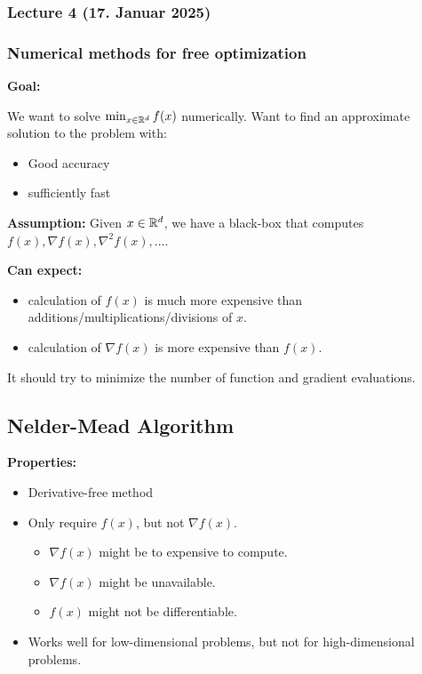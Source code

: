 \subsubsection{Lecture 4 (17. Januar 2025)}

\subsubsection*{Numerical methods for free optimization}

\textbf{Goal:}

We want to solve \( \min_{x \in \mathbb{R}^d} f(x) \) numerically. Want to find an approximate solution to the problem with:

\begin{itemize}
    \item Good accuracy
    \item sufficiently fast
\end{itemize}

\textbf{Assumption:} Given $ x \in \mathbb{R}^d $, we have a black-box that computes $f(x), \nabla f(x), \nabla^2 f(x) , \ldots $.

\textbf{Can expect:}
\begin{itemize}
    \item calculation of \(f(x)\) is much more expensive than additions/multiplications/divisions of \(x\).
    \item calculation of \(\nabla f(x)\) is more expensive than \(f(x)\).
\end{itemize}

It should try to minimize the number of function and gradient evaluations.

\subsection*{Nelder-Mead Algorithm}
\textbf{Properties:}
\begin{itemize}
    \item Derivative-free method
    \item Only require $f(x)$, but not $\nabla f(x)$.
          \begin{itemize}
              \item $\nabla f(x)$ might be to expensive to compute.
              \item $\nabla f(x)$ might be unavailable.
              \item $f(x)$ might not be differentiable.
          \end{itemize}
    \item Works well for low-dimensional problems, but not for high-dimensional problems.
\end{itemize}

